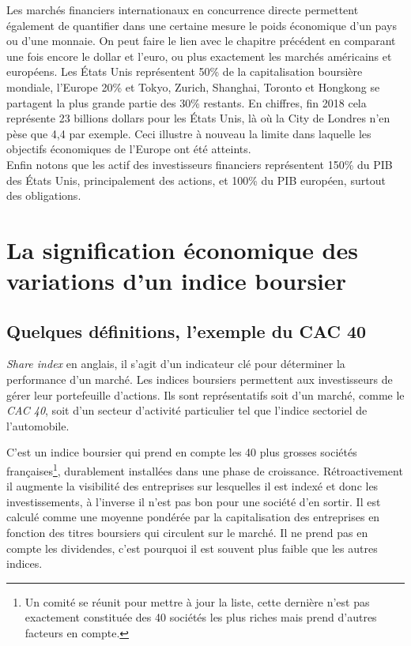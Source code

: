 \documentclass[main.tex]{subfiles}
\begin{document}
Les marchés financiers internationaux en concurrence directe permettent également de quantifier dans une certaine mesure le poids économique d'un pays ou d'une monnaie. On peut faire le lien avec le chapitre précédent en comparant une fois encore le dollar et l'euro, ou plus exactement les marchés américains et européens. Les États Unis représentent 50\% de la capitalisation boursière mondiale, l'Europe 20\% et Tokyo, Zurich, Shanghai, Toronto et Hongkong se partagent la plus grande partie des 30\% restants. En chiffres, fin 2018 cela représente 23 billions dollars pour les États Unis, là où la City de Londres n'en pèse que 4,4 par exemple. Ceci illustre à nouveau la limite dans laquelle les objectifs économiques de l'Europe ont été atteints. \\
Enfin notons que les actif des investisseurs financiers représentent 150\% du PIB des États Unis, principalement des actions, et 100\% du PIB européen, surtout des obligations.


\section{La signification économique des variations d'un indice boursier}

\subsection{Quelques définitions, l'exemple du CAC 40}

\begin{definition}
        \emph{Share index} en anglais, il s'agit d'un indicateur clé pour déterminer la performance d'un marché. Les indices boursiers permettent aux investisseurs de gérer leur portefeuille d'actions. Ils sont représentatifs soit d'un marché, comme le \emph{CAC 40}, soit d'un secteur d'activité particulier tel que l'indice sectoriel de l'automobile.
\end{definition}

\begin{definition}[CAC 40]
        C'est un indice boursier qui prend en compte les 40 plus grosses sociétés françaises\footnote{Un comité se réunit pour mettre à jour la liste, cette dernière n'est pas exactement constituée des 40 sociétés les plus riches mais prend d'autres facteurs en compte.}, durablement installées dans une phase de croissance. Rétroactivement il augmente la visibilité des entreprises sur lesquelles il est indexé et donc les investissements, à l'inverse il n'est pas bon pour une société d'en sortir. Il est calculé comme une moyenne pondérée par la capitalisation des entreprises en fonction des titres boursiers qui circulent sur le marché. Il ne prend pas en compte les dividendes, c'est pourquoi il est souvent plus faible que les autres indices.
\end{definition}
\end{document}
